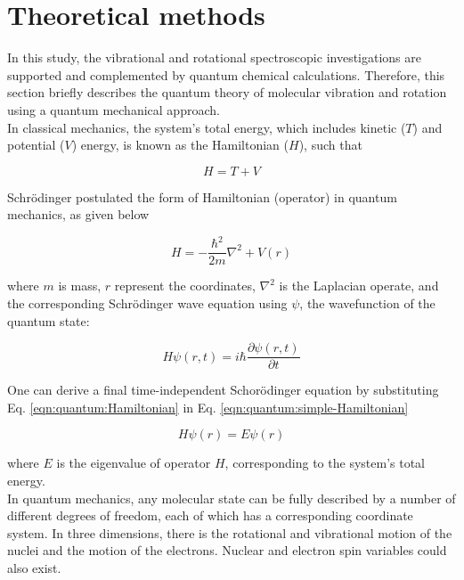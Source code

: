 \section{Theoretical methods}
\label{sec:theory}

In this study, the vibrational and rotational spectroscopic investigations are
supported and complemented by quantum chemical calculations. Therefore, this
section briefly describes the quantum theory of molecular vibration and
rotation using a quantum mechanical approach.\\

In classical mechanics, the system's total energy, which includes kinetic ($T$)
and potential ($V$) energy, is known as the Hamiltonian ($H$), such that

\begin{equation}
    \label{eqn:classical:Hamiltonian}
    H = T + V
\end{equation}

Schr\"odinger postulated the form of Hamiltonian (operator) in quantum
mechanics, as given below

\begin{equation}
    \label{eqn:quantum:Hamiltonian}
    H = - \frac{\hbar^2}{2m} \nabla^2 + V(r)
\end{equation}

where $m$ is mass, $r$ represent the coordinates, $\nabla^2$ is the Laplacian
operate, and the corresponding Schr\"odinger wave equation using $\psi$, the
wavefunction of the quantum state:

\begin{equation}
    \label{eqn:quantum:simple-Hamiltonian}
    H\psi(r, t) = i \hbar \frac{\partial \psi(r, t)}{\partial t}
\end{equation}

One can derive a final time-independent Schor\"odinger equation by substituting
Eq. \ref{eqn:quantum:Hamiltonian} in Eq. \ref{eqn:quantum:simple-Hamiltonian}

\begin{equation}
    \label{eqn:quantum:wave-eqn}
    H\psi(r) = E\psi(r)
\end{equation}

where $E$ is the eigenvalue of operator $H$, corresponding to the system's
total energy.\\

In quantum mechanics, any molecular state can be fully described by a number of
different degrees of freedom, each of which has a corresponding coordinate
system. In three dimensions, there is the rotational and vibrational motion of
the nuclei and the motion of the electrons. Nuclear and electron spin variables
could also exist.\\

